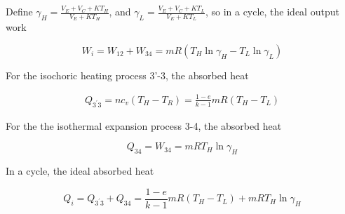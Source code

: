\documentclass[preprint,5p, twocolumn]{elsarticle}
\begin{document}
Define $\gamma_H = \frac{V_E+V_C+KT_H}{V_E+KT_H}$, and $\gamma_L = \frac{V_E+V_C+KT_L}{V_E+KT_L}$, so in a cycle, the ideal output work

\begin{equation}
	W_i = W_{12} + W_{34} = mR(T_H\ln\gamma_H - T_L\ln\gamma_L)
\end{equation}

For the isochoric heating process 3'-3, the absorbed heat

\begin{equation}
	\begin{split}
		Q_{3^{'}3} = nc_v(T_H-T_R)
		=\frac{1-e}{k-1}mR(T_H-T_L)
	\end{split}
\end{equation}


For the the isothermal expansion process 3-4, the absorbed heat

\begin{equation}
	Q_{34} = W_{34} = mRT_H\ln\gamma_H
\end{equation}

In a cycle, the ideal absorbed heat

\begin{equation}
	Q_i = Q_{3^{'}3} + Q_{34} = \frac{1-e}{k-1}mR(T_H-T_L) + mRT_H\ln\gamma_H
\end{equation}


%
%
\end{document}
